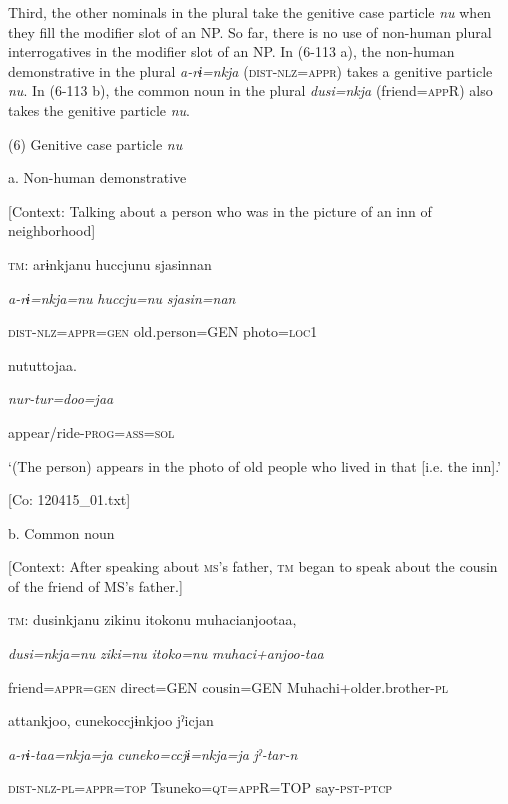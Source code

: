   Third, the other nominals in the plural take the genitive case particle \textit{nu} when they fill the modifier slot of an NP. So far, there is no use of non-human plural interrogatives in the modifier slot of an NP. In (6-113 a), the non-human demonstrative in the plural \textit{a-rɨ=nkja} (\textsc{dist}-\textsc{nlz}=\textsc{appr}) takes a genitive particle \textit{nu}. In (6-113 b), the common noun in the plural \textit{dusi=nkja} (friend=\textsc{app}R) also takes the genitive particle \textit{nu}.

(6)  Genitive case particle \textit{nu}

  a.  Non-human demonstrative

    [Context: Talking about a person who was in the picture of an inn of neighborhood]

    \textsc{tm}:  arɨnkjanu  huccjunu  sjasinnan

      \textit{a-rɨ=nkja=nu}  \textit{huccju=nu}  \textit{sjasin=nan}

      \textsc{dist}-\textsc{nlz}=\textsc{appr}=\textsc{gen}  old.person=GEN  photo=\textsc{loc}1

      nututtojaa.

      \textit{nur-tur=doo=jaa}

      appear/ride-\textsc{prog}=\textsc{ass}=\textsc{sol}

      ‘(The person) appears in the photo of old people who lived in that [i.e. the inn].’

      [Co: 120415\_01.txt]

  b.  Common noun

    [Context: After speaking about \textsc{ms}’s father, \textsc{tm} began to speak about the cousin of the friend of MS’s father.]

    \textsc{tm}:  dusinkjanu  zikinu  {\textbar}itoko{\textbar}nu  muhacianjootaa,

      \textit{dusi=nkja=nu}  \textit{ziki=nu}  \textit{itoko=nu}  \textit{muhaci+anjoo-taa}

      friend=\textsc{appr}=\textsc{gen}  direct=GEN  cousin=GEN  Muhachi+older.brother-\textsc{pl}

      attankjoo,  cunekoccjɨnkjoo  jˀicjan

      \textit{a-rɨ-taa=nkja=ja}  \textit{cuneko=ccjɨ=nkja=ja}  \textit{jˀ-tar-n}

      \textsc{dist}-\textsc{nlz}-\textsc{pl}=\textsc{appr}=\textsc{top}  Tsuneko=\textsc{qt}=\textsc{app}R=TOP  say-\textsc{pst}-\textsc{ptcp}

